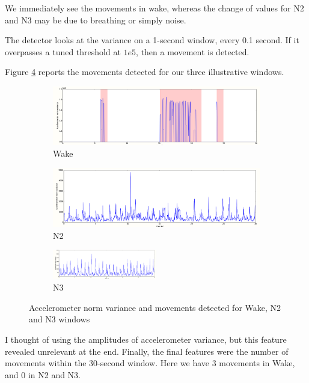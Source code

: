 \documentclass[12pt]{report}
\begin{document}
We immediately see the movements in wake, whereas the change of values for N2 and N3 may be due to breathing or simply noise.

The detector looks at the variance on a 1-second window, every 0.1 second. If it overpasses a tuned threshold at $1e5$, then a movement is detected.

Figure \ref{fig:3winsows_accvar} reports the movements detected for our three illustrative windows.

 \begin{figure}[H]
 \begin{subfigure}{0.5\textwidth}
 	\centering
 	\includegraphics[width=1\textwidth]{img/chap2/wake_accvar.png}
 	\caption{Wake}
 	\label{fig:wake_mov}
 \end{subfigure}
 \begin{subfigure}{0.5\textwidth}
 	\centering
 	\includegraphics[width=1\textwidth]{img/chap2/n2_accvar.png}
 	\caption{N2}
 	\label{fig:n2_mov}
 \end{subfigure}
 \begin{subfigure}{1\textwidth}
 	\centering
 	\includegraphics[width=0.5\textwidth]{img/chap2/n3_accvar.png}
 	\caption{N3}
 	\label{fig:n3_mov}
 \end{subfigure}
 
  \caption{\label{fig:3winsows_accvar}Accelerometer norm variance and movements detected for Wake, N2 and N3 windows}
  \end{figure}

I thought of using the amplitudes of accelerometer variance, but this feature revealed unrelevant at the end. Finally, the final features were the number of movements within the 30-second window. Here we have 3 movements in Wake, and 0 in N2 and N3.
\end{document}
